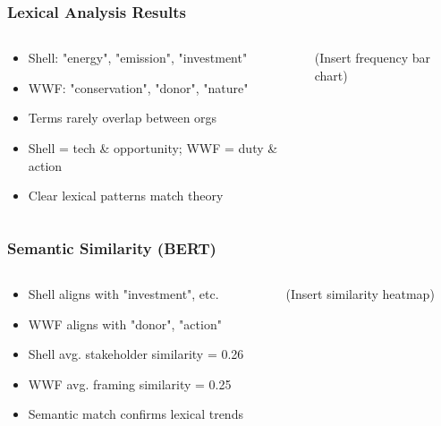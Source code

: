 \documentclass[aspectratio=1610]{beamer}
\begin{document}
\begin{frame}
  \frametitle{Lexical Analysis Results}
  \begin{columns}
    \begin{column}{0.6\textwidth}
      \begin{itemize}
        \item Shell: "energy", "emission", "investment"
        \item WWF: "conservation", "donor", "nature"
        \item Terms rarely overlap between orgs
        \item Shell = tech \& opportunity; WWF = duty \& action
        \item Clear lexical patterns match theory
      \end{itemize}
    \end{column}
    \begin{column}{0.4\textwidth}
      (Insert frequency bar chart)
    \end{column}
  \end{columns}
\end{frame}

\begin{frame}
  \frametitle{Semantic Similarity (BERT)}
  \begin{columns}
    \begin{column}{0.6\textwidth}
      \begin{itemize}
        \item Shell aligns with "investment", etc.
        \item WWF aligns with "donor", "action"
        \item Shell avg. stakeholder similarity = 0.26
        \item WWF avg. framing similarity = 0.25
        \item Semantic match confirms lexical trends
      \end{itemize}
    \end{column}
    \begin{column}{0.4\textwidth}
      (Insert similarity heatmap)
    \end{column}
  \end{columns}
\end{frame}
\end{document}
